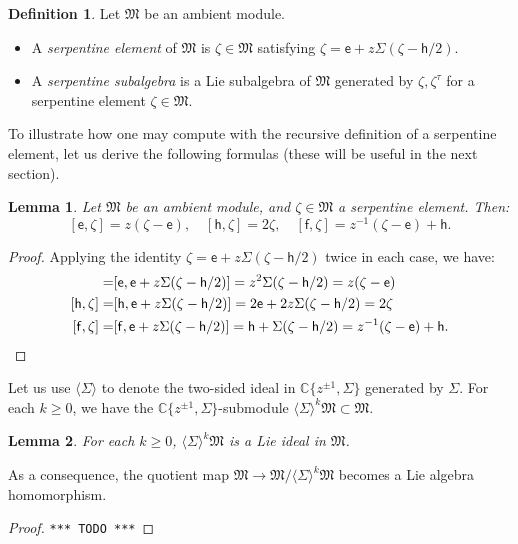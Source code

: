 \documentclass{article}
\def\MISS{\texttt{*** TODO ***}}
\def\fM{\mathfrak{M}}
\def\CC{\mathbb{C}}
\def\inv{\tau} %
\def\e{\mathsf{e}}
\def\h{\mathsf{h}}
\def\f{\mathsf{f}}
\newtheorem{lem}{Lemma}
\theoremstyle{definition}
\newtheorem{defn}{Definition}
\begin{document}
\begin{defn}Let $\fM$ be an ambient module.
        \begin{itemize}
\item A \emph{serpentine element} of $\fM$
                        is
        $\zeta \in \fM$ satisfying $\zeta = \e + z\Sigma(\zeta - \h/2)$.
\item A \emph{serpentine subalgebra} is a Lie subalgebra of $\fM$
        generated by $\zeta,\zeta^\inv$ for a serpentine element $\zeta \in\fM$.
\end{itemize}
\end{defn}
To illustrate how one may compute with the recursive
definition of a serpentine element, let us derive the
following formulas (these will be useful in the next section).
\begin{lem}\label{lem:sl2-on-zeta}
        Let $\fM$ be an ambient module, and $\zeta\in\fM$ a serpentine element.
        Then:
$$              [\e,\zeta] = z(\zeta-\e),\quad
                [\h,\zeta] = 2\zeta,\quad
                [\f,\zeta] = z^{-1}(\zeta-\e) + \h. $$
\end{lem}
\begin{proof}
        Applying the identity $\zeta = \e + z\Sigma(\zeta - \h/2)$ twice in each case, we have:
        \begin{align*}
                [\e,\zeta] =& [\e, \e + z\Sigma(\zeta-\h/2)] = z^2\Sigma(\zeta-\h/2) = z(\zeta - \e) \\
                [\h,\zeta] =& [\h, \e + z\Sigma(\zeta-\h/2)] = 2\e + 2z\Sigma(\zeta-\h/2) = 2\zeta   \\
                [\f,\zeta] =& [\f, \e + z\Sigma(\zeta-\h/2)] = \h + \Sigma(\zeta-\h/2) = z^{-1}(\zeta-\e) + \h.
                \qedhere
        \end{align*}        
\end{proof}

Let us use $\langle \Sigma\rangle$ to denote the two-sided
ideal in $\CC\{z^{\pm1},\Sigma\}$ generated by $\Sigma$.
For each $k\ge0$, we have the
$\CC\{z^{\pm1},\Sigma\}$-submodule $\langle\Sigma\rangle^k\fM \subset \fM$.
\begin{lem}
        For each $k\ge0$, $\langle\Sigma\rangle^k\fM$ is a Lie ideal in $\fM$.
\end{lem}
As a consequence, the quotient map $\fM\to \fM/\langle\Sigma\rangle^k\fM$ 
becomes a Lie algebra homomorphism.
\begin{proof}\MISS\end{proof}
\end{document}
